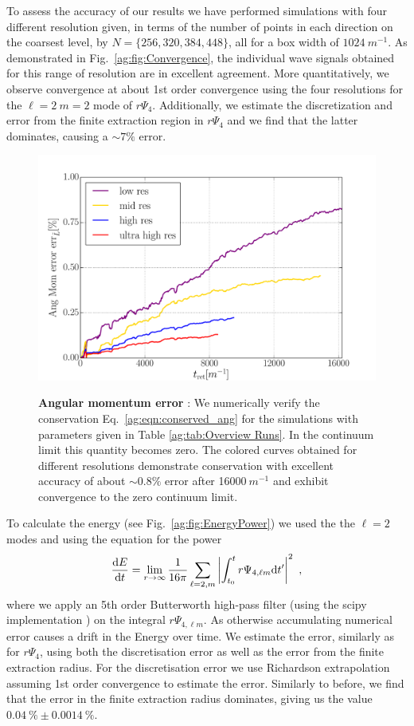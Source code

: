 To assess the accuracy of our results we have performed simulations with four different resolution given, in terms of the number of points in each direction on the coarsest level, by $N = \{256,320,384,448\}$, all for a box width
of $1024~m^{-1}$. As demonstrated in Fig.~\ref{ag:fig:Convergence}, the individual wave signals obtained for this range of resolution are
in excellent agreement.
More quantitatively, we observe convergence at about 1st order convergence using the four resolutions for the $\ell = 2~m=2$ mode of $r\Psi_4$. Additionally, we estimate the discretization and error from the finite extraction region in $r\Psi_4$ and we find that the latter dominates, causing a $\sim 7\%$ error.


\begin{figure}[h!]
\begin{center}
{\includegraphics[width=0.7\columnwidth]{ag_fig/ang_error_flux_with_radius_60.pdf}}
    \caption{{\bf Angular momentum error }: We numerically
    verify the conservation Eq.~\ref{ag:eqn:conserved_ang} for the simulations with parameters
    given in Table \ref{ag:tab:Overview Runs}. In the continuum limit this
    quantity becomes zero. The colored curves
    obtained for different resolutions demonstrate
    conservation with excellent accuracy of
    about $\sim 0.8\%$ error after 16000$~m^{-1}$
    and exhibit convergence to the zero continuum limit.
    }
\label{ag:fig:ViolCons}
\end{center}
\end{figure}




To calculate the energy (see Fig.~\ref{ag:fig:EnergyPower}) we used the the $\ell = 2 $ modes and using the equation for the power
\begin{equation}\label{ag:eq:GWpower}
    \frac{{\rm d}E}{{\rm d}t} = \lim_{r\rightarrow \infty} \frac{1}{16 \pi} \sum_{\ell = 2, m} \left|\int_{t_0}^{t}  r\Psi_{4,\ell m}{\rm d}t^\prime \right|^2~,
\end{equation}
where we apply an 5th order Butterworth high-pass filter (using the scipy implementation \cite{jones_scipy_2001}) on the integral $r\Psi_{4,\ell m}$. As otherwise accumulating numerical error causes a  drift in the Energy over time.
We estimate the error, similarly as for $r\Psi_4$, using both the discretisation error as well as the error from the finite extraction radius. For the discretisation error we use Richardson extrapolation assuming 1st order convergence to estimate the error. Similarly to before, we find that the error in the finite extraction radius dominates, giving us the value $ 0.04~\% \pm 0.0014~\% $.

